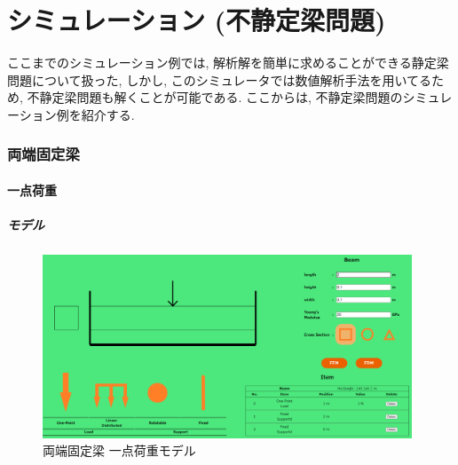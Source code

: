\documentclass{jsarticle}
\begin{document}
\newpage
\part{シミュレーション (不静定梁問題)}
ここまでのシミュレーション例では, 解析解を簡単に求めることができる静定梁問題について扱った, しかし, このシミュレータでは数値解析手法を用いてるため, 不静定梁問題も解くことが可能である. ここからは, 不静定梁問題のシミュレーション例を紹介する.

\newpage
\section{両端固定梁}
\subsection{一点荷重}
\subsubsection{モデル}
\begin{figure}[H]
\begin{center}
\includegraphics[width=11cm]{fixed_one_model.PNG}
\caption{両端固定梁 一点荷重モデル}
\end{center}
\end{figure}
\end{document}
